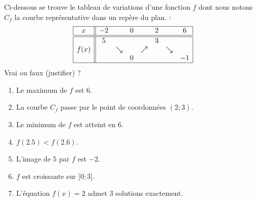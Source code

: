 
\begin{exercice}\label{exosmath-0549}

    Ci-dessous se trouve le tableau de variations d'une fonction \( f\) dont nous notons \( C_f\) la courbe représentative dans un repère du plan. :
    \begin{equation*}
        \begin{array}[]{|c||ccccccc|}
            \hline
            x&-2&&0&&2&&6\\
            \hline\hline
            &5&&&&3&&\\
            f(x)&&\searrow&&\nearrow&&\searrow&\\
            &&&0&&&&-1\\
            \hline
        \end{array}
    \end{equation*}
    Vrai ou faux (justifier) ?
    \begin{enumerate}
        \item
            Le maximum de $f$ est \( 6\).
        \item
            La courbe \( C_f\) passe par le point de coordonnées \( (2;3)\).
        \item
            Le minimum de \( f\) est atteint en \( 6\).
        \item
            \( f(2.5)<f(2.6)\).
        \item
            L'image de \( 5\) par \( f\) est \( -2\).
        \item
            \( f\) est croissante sur \( \mathopen[ 0 ; 3 \mathclose]\).
        \item
            L'équation \( f(x)=2\) admet \( 3\) solutions exactement.
    \end{enumerate}

\end{exercice}
